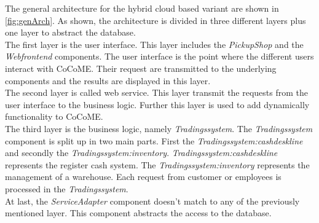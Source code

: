 The general architecture for the hybrid cloud based variant are shown in \autoref{fig:genArch}. As shown, the architecture is divided in three different layers plus one layer to abstract the database.\\
The first layer is the user interface. This layer includes the \textit{PickupShop} and the \textit{Webfrontend} components. The user interface is the point where the different users interact with CoCoME. Their request are transmitted to the underlying components and the results are displayed in this layer. \\ 
The second layer is called web service. This layer transmit the requests from the user interface to the business logic. Further this layer is used to add dynamically functionality to CoCoME.\\ 
The third layer is the business logic, namely \textit{Tradingssystem}. The \textit{Tradingssystem} component is split up in two main parts. First the \textit{Tradingssystem:cashdeskline} and secondly the \textit{Tradingssystem:inventory}. \textit{Tradingssystem:cashdeskline} represents the register cash system. The \textit{Tradingssystem:inventory} represents the management of a warehouse. Each request from customer or employees is processed in the \textit{Tradingssystem}.\\ 
At last, the \textit{ServiceAdapter} component doesn't match to any of the previously mentioned layer. This component abstracts the access to the database. \\
